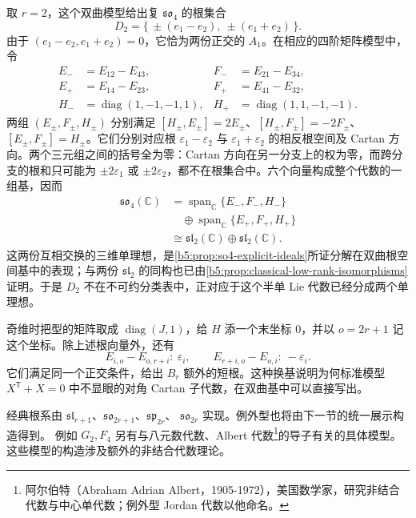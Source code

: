 \ProseParagraphBreak

取 \(r=2\)，这个双曲模型给出复 \(\mathfrak{so}_4\) 的根集合
\[
	D_2=\{\,\pm(e_1-e_2),\ \pm(e_1+e_2)\,\}.
\]
由于 \((e_1-e_2,e_1+e_2)=0\)，它恰为两份正交的 \(A_1\)。在相应的四阶矩阵模型中，令
\[
	\begin{aligned}
		E_-&=E_{12}-E_{43},&F_-&=E_{21}-E_{34},\\
		E_+&=E_{14}-E_{23},&F_+&=E_{41}-E_{32},\\
		H_-&=\operatorname{diag}(1,-1,-1,1),& H_+&=\operatorname{diag}(1,1,-1,-1).
	\end{aligned}
\]
两组 \((E_\pm,F_\pm,H_\pm)\) 分别满足 \([H_\pm,E_\pm]=2E_\pm\)、\([H_\pm,F_\pm]=-2F_\pm\)、\([E_\pm,F_\pm]=H_\pm\)。它们分别对应根 \(\varepsilon_1-\varepsilon_2\) 与 \(\varepsilon_1+\varepsilon_2\) 的相反根空间及 Cartan 方向。两个三元组之间的括号全为零：Cartan 方向在另一分支上的权为零，而跨分支的根和只可能为 \(\pm2\varepsilon_1\) 或 \(\pm2\varepsilon_2\)，都不在根集合中。六个向量构成整个代数的一组基，因而
\[
	\begin{aligned}
		\mathfrak{so}_4(\mathbb C) &=\operatorname{span}_{\mathbb C}\{E_-,F_-,H_-\}\\
		&\quad\oplus\operatorname{span}_{\mathbb C}\{E_+,F_+,H_+\}\\
		&\cong\mathfrak{sl}_2(\mathbb C)\oplus\mathfrak{sl}_2(\mathbb C).
	\end{aligned}
\]
这两份互相交换的三维单理想，是\cref{b5:prop:so4-explicit-ideals}所证分解在双曲根空间基中的表现；与两份 \(\mathfrak{sl}_2\) 的同构也已由\cref{b5:prop:classical-low-rank-isomorphisms}证明。于是 \(D_2\) 不在不可约分类表中，正对应于这个半单 Lie 代数已经分成两个单理想。

\ProseParagraphBreak

奇维时把型的矩阵取成 \(\operatorname{diag}(J,1)\)，给 \(H\) 添一个末坐标 \(0\)，并以 \(o=2r+1\) 记这个坐标。除上述根向量外，还有
\[
	E_{i,o}-E_{o,r+i}:\ \varepsilon_i, \qquad E_{r+i,o}-E_{o,i}:\ -\varepsilon_i.
\]
它们满足同一个正交条件，给出 \(B_r\) 额外的短根。这种换基说明为何标准模型 \(X^{\mathsf T}+X=0\) 中不显眼的对角 Cartan 子代数，在双曲基中可以直接写出。

\ProseParagraphBreak
经典根系由 \(\mathfrak{sl}_{r+1}\)、\(\mathfrak{so}_{2r+1}\)、\(\mathfrak{sp}_{2r}\)、 \(\mathfrak{so}_{2r}\) 实现。例外型也将由下一节的统一展示构造得到。 例如 \(G_2,F_4\) 另有与八元数代数、Albert 代数\footnote{阿尔伯特（Abraham Adrian Albert，1905-1972），美国数学家，研究非结合代数与中心单代数；例外型 Jordan 代数以他命名。}的导子有关的具体模型。这些模型的构造涉及额外的非结合代数理论。
